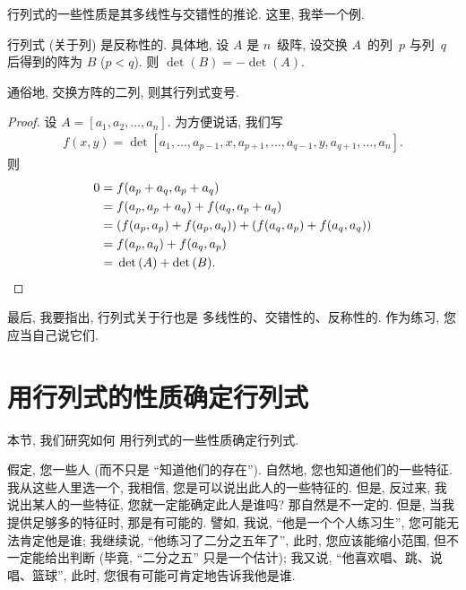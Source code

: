\documentclass[%
    UTF8,%
    fontset=none,%
    punct=kaiming,%
    zihao=-4,%
    a4paper,%
    oneside,%
]{ctexbook}
\let\emph\relax
\begin{document}
行列式的一些性质是其多线性与交错性的推论.
这里, 我举一个例.

\begin{theorem}[反称性]
    行列式 (关于列) 是反称性的.
    具体地,
    设 \(A\) 是 \(n\)~级阵,
    设交换 \(A\)~的列~\(p\) 与列~\(q\) 后得到的阵为 \(B\)
    (\(p < q\)).
    则 \(\det {(B)} = -\det {(A)}\).

    通俗地, 交换方阵的二列, 则其行列式变号.
\end{theorem}

\begin{proof}
    设 \(A = [a_1, a_2, \dots, a_n]\).
    为方便说话, 我们写
    \begin{align*}
        f(x, y)
        = \det {[a_1, \dots, a_{p-1}, x, a_{p+1}, \dots,
                    a_{q-1}, y, a_{q+1}, \dots, a_n]}.
    \end{align*}
    则
    \begin{align*}
        0
        = {} & f(a_p + a_q, a_p + a_q)               \\
        = {} & f(a_p, a_p + a_q) + f(a_q, a_p + a_q) \\
        = {} & (f(a_p, a_p) + f(a_p, a_q))
        + (f(a_q, a_p) + f(a_q, a_q))                \\
        = {} & f(a_p, a_q) + f(a_q, a_p)             \\
        = {} & \det {(A)} + \det {(B)}.
        \qedhere
    \end{align*}
\end{proof}

最后, 我要指出,
行列式关于行也是%
多线性的、交错性的、反称性的.
作为练习, 您应当自己说它们.

\section{用行列式的性质确定行列式}

本节, 我们研究如何%
用行列式的一些性质确定行列式.

假定, 您\emph{熟悉}一些人
(而不只是 ``知道他们的存在'').
自然地, 您也知道他们的一些特征.
我从这些人里选一个,
我相信, 您是可以说出此人的一些特征的.
但是, 反过来,
我说出某人的一些特征,
您就一定能确定此人是谁吗?
那自然是不一定的.
但是, 当我提供足够多的特征时,
那是有可能的.
譬如, 我说, ``他是一个个人练习生'',
您可能无法肯定他是谁;
我继续说, ``他练习了二分之五年了'',
此时, 您应该能缩小范围,
但不一定能给出判断
(毕竟, ``二分之五'' 只是一个估计);
我又说, ``他喜欢唱、跳、说唱、篮球'',
此时, 您很有可能可肯定地告诉我他是谁.
\end{document}
